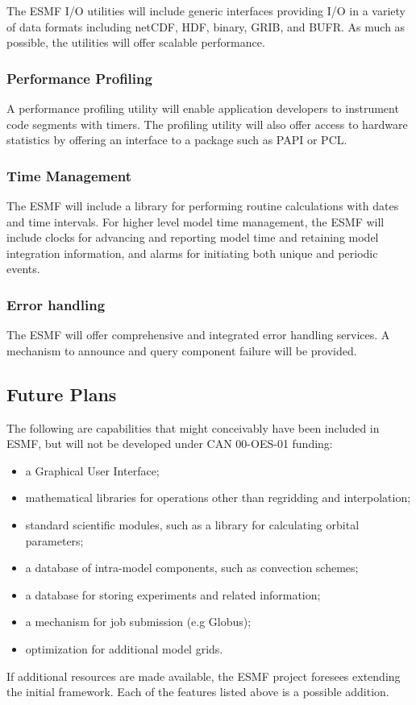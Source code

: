 The ESMF I/O utilities will include generic interfaces providing I/O
in a variety of data formats including netCDF, HDF, binary, GRIB, and
BUFR. As much as possible, the utilities will offer scalable
performance.

\subsubsection{Performance Profiling}

A performance profiling utility will enable application developers to 
instrument code segments with timers. The profiling utility will also
offer access to hardware statistics by offering an interface to a
package such as PAPI or PCL.

\subsubsection{Time Management}

The ESMF will include a library for performing routine 
calculations with dates and time intervals.  For higher level model
time management, the ESMF will include clocks for advancing and 
reporting model time and retaining model integration information, 
and alarms for initiating both unique and periodic events.

\subsubsection{Error handling}

The ESMF will offer comprehensive and integrated error handling
services.  A mechanism to announce and query component failure will be
provided.

\subsection{Future Plans}

The following are capabilities that might conceivably have been
included in ESMF, but will not be developed under CAN 00-OES-01
funding:
\begin{itemize}
\item a Graphical User Interface;
\item mathematical libraries for operations other than regridding and
  interpolation;
\item standard scientific modules, such as a library for calculating
  orbital parameters;
\item a database of intra-model components, such as convection schemes;
\item a database for storing experiments and related information;
\item a mechanism for job submission (e.g Globus);
\item optimization for additional model grids.
\end{itemize}

If additional resources are made available, the ESMF project foresees
extending the initial framework.  Each of the features listed above is
a possible addition.




















